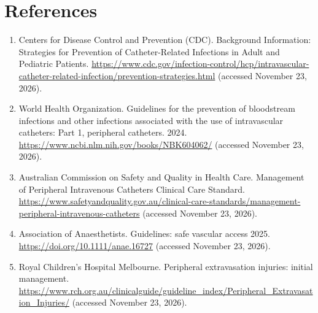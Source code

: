 \section*{References}
\begin{enumerate}
  \item Centers for Disease Control and Prevention (CDC). Background Information: Strategies for Prevention of Catheter-Related Infections in Adult and Pediatric Patients. \url{https://www.cdc.gov/infection-control/hcp/intravascular-catheter-related-infection/prevention-strategies.html} (accessed November 23, 2026).
  \item World Health Organization. Guidelines for the prevention of bloodstream infections and other infections associated with the use of intravascular catheters: Part 1, peripheral catheters. 2024. \url{https://www.ncbi.nlm.nih.gov/books/NBK604062/} (accessed November 23, 2026).
  \item Australian Commission on Safety and Quality in Health Care. Management of Peripheral Intravenous Catheters Clinical Care Standard. \url{https://www.safetyandquality.gov.au/clinical-care-standards/management-peripheral-intravenous-catheters} (accessed November 23, 2026).
  \item Association of Anaesthetists. Guidelines: safe vascular access 2025. \url{https://doi.org/10.1111/anae.16727} (accessed November 23, 2026).
  \item Royal Children's Hospital Melbourne. Peripheral extravasation injuries: initial management. \url{https://www.rch.org.au/clinicalguide/guideline_index/Peripheral_Extravasation_Injuries/} (accessed November 23, 2026).
\end{enumerate}

\clearpage
